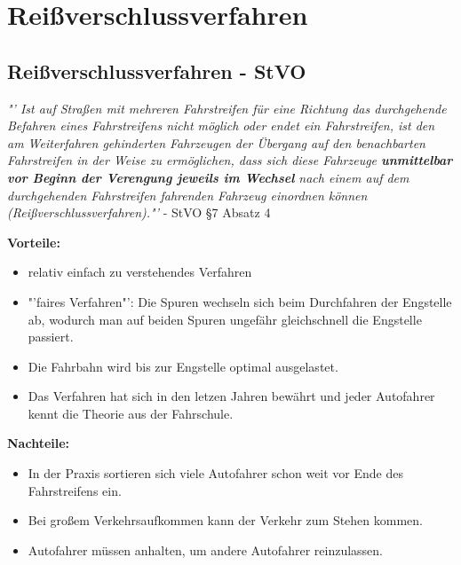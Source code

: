 \chapter{Reißverschlussverfahren}
\section{Reißverschlussverfahren - StVO}
\begin{center}
	\textit{"' Ist auf Straßen mit mehreren Fahrstreifen für eine Richtung das durchgehende Befahren eines Fahrstreifens nicht möglich oder endet ein Fahrstreifen, ist den am Weiterfahren gehinderten Fahrzeugen der Übergang auf den benachbarten Fahrstreifen in der Weise zu ermöglichen, dass sich diese Fahrzeuge \textbf{unmittelbar vor Beginn der Verengung jeweils im Wechsel} nach einem auf dem durchgehenden Fahrstreifen fahrenden Fahrzeug einordnen können (Reißverschlussverfahren)."'} - StVO \S 7 Absatz 4 \cite{StrassenVerkehrsBehorde.01.04.2013}
\end{center}
\textbf{Vorteile:} 
\begin{itemize}
	\item relativ einfach zu verstehendes Verfahren
\item "'faires Verfahren"': Die Spuren wechseln sich beim Durchfahren der Engstelle ab, wodurch man auf beiden Spuren ungefähr gleichschnell die Engstelle passiert.
\item Die Fahrbahn wird bis zur Engstelle optimal ausgelastet.
\item Das Verfahren hat sich in den letzen Jahren bewährt und jeder Autofahrer kennt die Theorie aus der Fahrschule.
\end{itemize}
\textbf{Nachteile:}
\begin{itemize}
	\item In der Praxis sortieren sich viele Autofahrer schon weit vor Ende des Fahrstreifens ein.
\item Bei großem Verkehrsaufkommen kann der Verkehr zum Stehen kommen.
\item Autofahrer müssen anhalten, um andere Autofahrer reinzulassen.
\end{itemize}
\newpage

